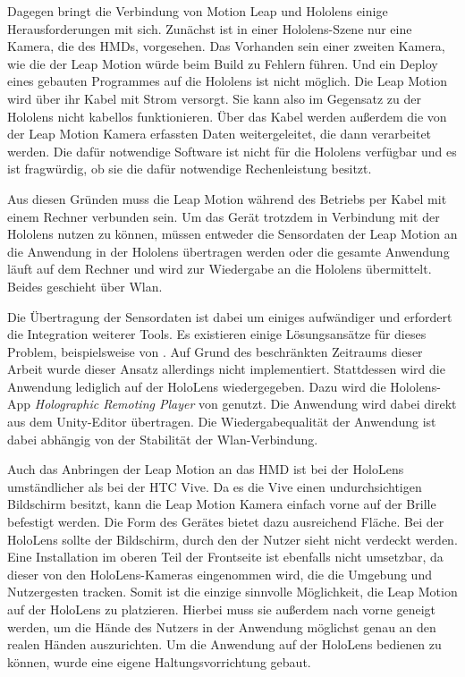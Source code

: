 Dagegen bringt die Verbindung von Motion Leap und Hololens einige Herausforderungen mit sich. Zunächst ist in einer Hololens-Szene nur eine Kamera, die des HMDs, vorgesehen. Das Vorhanden sein einer zweiten Kamera, wie die der Leap Motion würde beim Build zu Fehlern führen. Und ein Deploy eines gebauten Programmes auf die Hololens ist nicht möglich.
Die Leap Motion wird über ihr Kabel mit Strom versorgt. Sie kann also im Gegensatz zu der Hololens nicht kabellos funktionieren. 
Über das Kabel werden außerdem die von der Leap Motion Kamera erfassten Daten weitergeleitet, die dann verarbeitet werden. Die dafür notwendige Software ist nicht für die Hololens verfügbar und es ist fragwürdig, ob sie die dafür notwendige Rechenleistung besitzt. 

Aus diesen Gründen muss die Leap Motion während des Betriebs per Kabel mit einem Rechner verbunden sein. Um das Gerät trotzdem in Verbindung mit der Hololens nutzen zu können, müssen entweder die Sensordaten der Leap Motion an die Anwendung in der Hololens übertragen werden oder die gesamte Anwendung läuft auf dem Rechner und wird zur Wiedergabe an die Hololens übermittelt. Beides geschieht über Wlan.

Die Übertragung der Sensordaten ist dabei um einiges aufwändiger und erfordert die Integration weiterer Tools. Es existieren einige Lösungsansätze für dieses Problem, beispielsweise von \citet{hololensGithub}. Auf Grund des beschränkten Zeitraums dieser Arbeit wurde dieser Ansatz allerdings nicht implementiert.
Stattdessen wird die Anwendung lediglich auf der HoloLens wiedergegeben. Dazu wird die Hololens-App \textit{Holographic Remoting Player} von \citet{remoteApp} genutzt. Die Anwendung wird dabei direkt aus dem Unity-Editor übertragen.
Die Wiedergabequalität der Anwendung ist dabei abhängig von der Stabilität der Wlan-Verbindung.

Auch das Anbringen der Leap Motion an das HMD ist bei der HoloLens umständlicher als bei der HTC Vive. 
Da es die Vive einen undurchsichtigen Bildschirm besitzt, kann die Leap Motion Kamera einfach vorne auf der Brille befestigt werden. Die Form des Gerätes bietet dazu ausreichend Fläche.
Bei der HoloLens sollte der Bildschirm, durch den der Nutzer sieht nicht verdeckt werden. Eine Installation  im oberen Teil der Frontseite ist ebenfalls nicht umsetzbar, da dieser von den HoloLens-Kameras eingenommen wird, die die Umgebung und Nutzergesten tracken.
Somit ist die einzige sinnvolle Möglichkeit, die Leap Motion auf der HoloLens zu platzieren. Hierbei muss sie außerdem nach vorne geneigt werden, um die Hände des Nutzers in der Anwendung möglichst genau an den realen Händen auszurichten. 
Um die Anwendung auf der HoloLens bedienen zu können, wurde eine eigene Haltungsvorrichtung gebaut.

